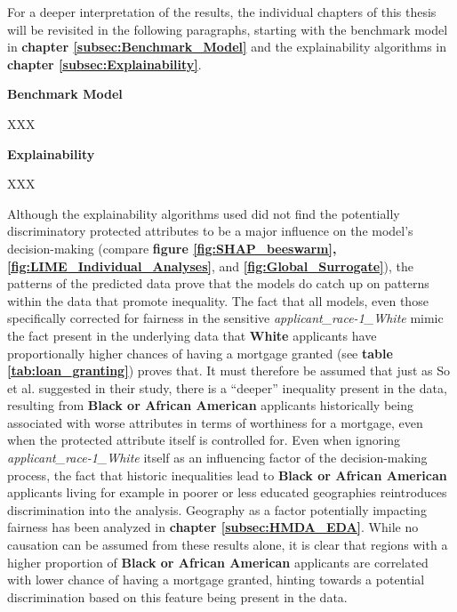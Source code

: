 
For a deeper interpretation of the results, the individual chapters of this thesis will be revisited in the following paragraphs, starting with the benchmark model in \textbf{chapter \ref{subsec:Benchmark_Model}} and the explainability algorithms in \textbf{chapter \ref{subsec:Explainability}}.


\textbf{Benchmark Model}

XXX

\textbf{Explainability}

XXX

Although the explainability algorithms used did not find the potentially discriminatory protected attributes to be a major influence on the model’s decision-making (compare \textbf{figure \ref{fig:SHAP_beeswarm}, \ref{fig:LIME_Individual_Analyses}}, and \textbf{\ref{fig:Global_Surrogate}}), the patterns of the predicted data prove that the models do catch up on patterns within the data that promote inequality. 
The fact that all models, even those specifically corrected for fairness in the sensitive \textit{applicant\_race-1\_White} mimic the fact present in the underlying data that \textbf{White} applicants have proportionally higher chances of having a mortgage granted (see \textbf{table \ref{tab:loan_granting}}) proves that. 
It must therefore be assumed that just as So et al. \parencite{So2022} suggested in their study, there is a “deeper” inequality present in the data, resulting from \textbf{Black or African American} applicants historically being associated with worse attributes in terms of worthiness for a mortgage, even when the protected attribute itself is controlled for.
Even when ignoring \textit{applicant\_race-1\_White} itself as an influencing factor of the decision-making process, the fact that historic inequalities lead to \textbf{Black or African American} applicants living for example in poorer or less educated geographies reintroduces discrimination into the analysis.
Geography as a factor potentially impacting fairness has been analyzed in \textbf{chapter \ref{subsec:HMDA_EDA}}. While no causation can be assumed from these results alone, it is clear that regions with a higher proportion of \textbf{Black or African American} applicants are correlated with lower chance of having a mortgage granted, hinting towards a potential discrimination based on this feature being present in the data.


